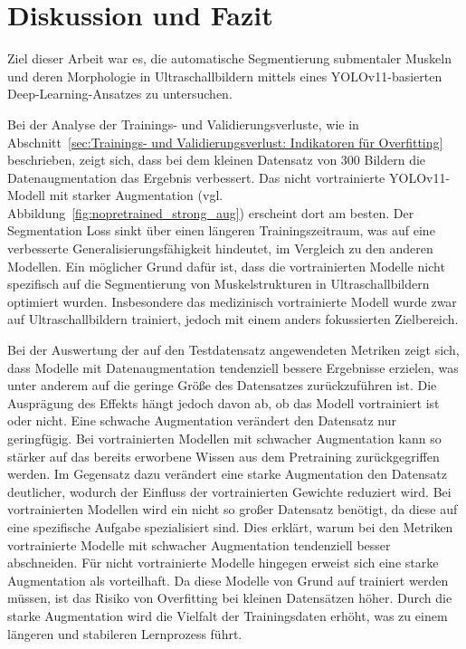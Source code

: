 \documentclass[
	german,
	accentcolor=10c,%
	type=intern,
	marginpar=false
	]{tudapub}
\begin{document}
\section{Diskussion und Fazit}
Ziel dieser Arbeit war es, die automatische Segmentierung submentaler Muskeln und deren Morphologie in Ultraschallbildern mittels eines YOLOv11-basierten Deep-Learning-Ansatzes zu untersuchen.

Bei der Analyse der Trainings- und Validierungsverluste, wie in Abschnitt~\ref{sec:Trainings- und Validierungsverlust: Indikatoren für Overfitting} beschrieben, zeigt sich, dass bei dem kleinen Datensatz von 300 Bildern die Datenaugmentation das Ergebnis verbessert. Das nicht vortrainierte YOLOv11-Modell mit starker Augmentation (vgl. Abbildung~\ref{fig:nopretrained_strong_aug}) erscheint dort am besten. Der Segmentation Loss sinkt über einen längeren Trainingszeitraum, was auf eine verbesserte Generalisierungsfähigkeit hindeutet, im Vergleich zu den anderen Modellen. Ein möglicher Grund dafür ist, dass die vortrainierten Modelle nicht spezifisch auf die Segmentierung von Muskelstrukturen in Ultraschallbildern optimiert wurden. Insbesondere das medizinisch vortrainierte Modell wurde zwar auf Ultraschallbildern trainiert, jedoch mit einem anders fokussierten Zielbereich.

Bei der Auswertung der auf den Testdatensatz angewendeten Metriken zeigt sich, dass Modelle mit Datenaugmentation tendenziell bessere Ergebnisse erzielen, was unter anderem auf die geringe Größe des Datensatzes zurückzuführen ist. Die Ausprägung des Effekts hängt jedoch davon ab, ob das Modell vortrainiert ist oder nicht. Eine schwache Augmentation verändert den Datensatz nur geringfügig. Bei vortrainierten Modellen mit schwacher Augmentation kann so stärker auf das bereits erworbene Wissen aus dem Pretraining zurückgegriffen werden. Im Gegensatz dazu verändert eine starke Augmentation den Datensatz deutlicher, wodurch der Einfluss der vortrainierten Gewichte reduziert wird. Bei vortrainierten Modellen wird ein nicht so großer Datensatz benötigt, da diese auf eine spezifische Aufgabe spezialisiert sind. Dies erklärt, warum bei den Metriken vortrainierte Modelle mit schwacher Augmentation tendenziell besser abschneiden. Für nicht vortrainierte Modelle hingegen erweist sich eine starke Augmentation als vorteilhaft. Da diese Modelle von Grund auf trainiert werden müssen, ist das Risiko von Overfitting bei kleinen Datensätzen höher. Durch die starke Augmentation wird die Vielfalt der Trainingsdaten erhöht, was zu einem längeren und stabileren Lernprozess führt. 
\end{document}
